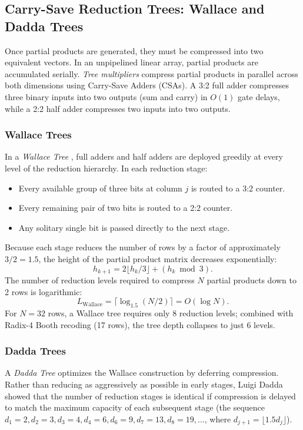 \subsection{Carry-Save Reduction Trees: Wallace and Dadda Trees}

Once partial products are generated, they must be compressed into two equivalent vectors. In an unpipelined linear array, partial products are accumulated serially. \textit{Tree multipliers} compress partial products in parallel across both dimensions using Carry-Save Adders (CSAs). A 3:2 full adder compresses three binary inputs into two outputs (sum and carry) in $O(1)$ gate delays, while a 2:2 half adder compresses two inputs into two outputs.

\subsubsection{Wallace Trees}
In a \textit{Wallace Tree} \cite{wallace1964}, full adders and half adders are deployed greedily at every level of the reduction hierarchy. In each reduction stage:
\begin{itemize}
    \item Every available group of three bits at column $j$ is routed to a 3:2 counter.
    \item Every remaining pair of two bits is routed to a 2:2 counter.
    \item Any solitary single bit is passed directly to the next stage.
\end{itemize}
Because each stage reduces the number of rows by a factor of approximately $3/2 = 1.5$, the height of the partial product matrix decreases exponentially:
\begin{equation}
h_{k+1} = 2 \lfloor h_k / 3 \rfloor + (h_k \bmod 3).
\end{equation}
The number of reduction levels required to compress $N$ partial products down to 2 rows is logarithmic:
\begin{equation}
L_{\text{Wallace}} = \lceil \log_{1.5} (N / 2) \rceil = O(\log N).
\end{equation}
For $N = 32$ rows, a Wallace tree requires only 8 reduction levels; combined with Radix-4 Booth recoding (17 rows), the tree depth collapses to just 6 levels.

\subsubsection{Dadda Trees}
A \textit{Dadda Tree} \cite{dadda1965} optimizes the Wallace construction by deferring compression. Rather than reducing as aggressively as possible in early stages, Luigi Dadda showed that the number of reduction stages is identical if compression is delayed to match the maximum capacity of each subsequent stage (the sequence $d_1 = 2, d_2 = 3, d_3 = 4, d_4 = 6, d_6 = 9, d_7 = 13, d_8 = 19, \dots$, where $d_{j+1} = \lfloor 1.5 d_j \rfloor$).

